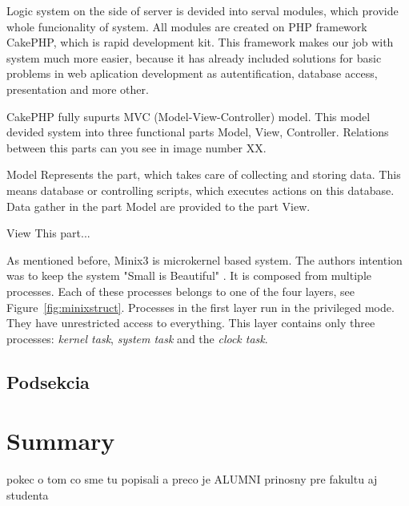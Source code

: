 \documentclass{iitsrc}[2006/14/02]
\newcommand\fig[4]{%
	\begin{figure}[h]
	\begin{center}
	\texttt{[image: \#2]}
	~\\%
	\caption{#4}
	\label{#3}
	\end{center}
	\end{figure}
}
\begin{document}
Logic system on the side of server is devided into serval modules, which provide whole funcionality of system. All modules are created on PHP  framework CakePHP, which is rapid development kit. This framework makes our job with system much more easier, because it has already included solutions for basic problems in web aplication development as autentification, database access, presentation and more other.

CakePHP fully supurts MVC (Model-View-Controller) model. This model devided system into three functional parts Model, View, Controller. Relations between this parts can you see in image number XX.

Model
Represents the part, which takes care of collecting and storing data. This means database or controlling scripts, which executes actions on this database. Data gather in the part Model are provided to the part View.

View
This part...
 
As mentioned before, Minix3 is microkernel based system. The authors intention was to keep the system "Small is Beautiful" \cite[page 17]{osdesign}.
It is composed from multiple processes. Each of these processes belongs to one of the four layers, see Figure~\ref{fig:minixstruct}. Processes in the first layer run in the privileged mode. They have unrestricted access to everything. This layer contains only three processes: {\em kernel task}, {\em system task} and the {\em clock task}.

%
\subsection{Podsekcia}

      
\section{Summary}

pokec o tom co sme tu popisali a preco je ALUMNI prinosny pre fakultu aj studenta 
  

\nocite{pcispec}
\nocite{ac97spec}
\nocite{ich4spec}
\nocite{crytalspec}
\nocite{osdesign}
\nocite{wdmdriver}
\nocite{alsadriver}
\nocite{pciwiki}



\end{document}
